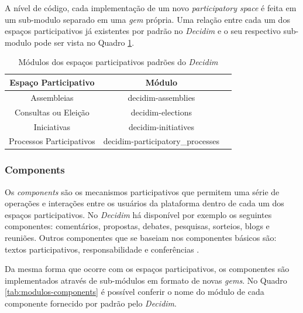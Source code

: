 A nível de código, cada implementação de um novo \textit{participatory space} é feita em um sub-modulo separado em uma \textit{gem} própria. Uma relação entre cada um dos espaços participativos já existentes por padrão no \textit{Decidim} e o seu respectivo sub-modulo pode ser vista no Quadro \ref{tab:modulos-participatoryspaces}.

\begin{table}
  \centering
  \caption{Módulos dos espaços participativos padrões do \textit{Decidim}}
  \label{tab:modulos-participatoryspaces}
  \begin{tabular}{|c|c|c|}
    \hline
    Espaço Participativo & Módulo \\
    \hline
    Assembleias & decidim-assemblies \\
    Consultas ou Eleição & decidim-elections \\
    Iniciativas & decidim-initiatives \\
    Processos Participativos & decidim-participatory\_processes \\
    \hline
  \end{tabular}
\end{table}

\subsubsection{Components}

Os \textit{components} são os mecanismos participativos que permitem uma série de operações e interações entre os usuários da plataforma dentro de cada um dos espaços participativos. No \textit{Decidim} há disponível por exemplo os seguintes componentes: comentários, propostas, debates, pesquisas, sorteios, blogs e reuniões. Outros componentes que se baseiam nos componentes básicos são: textos participativos, responsabilidade e conferências \cite{decidim-descriptionpage}.

Da mesma forma que ocorre com os espaços participativos, os componentes são implementados através de sub-módulos em formato de novas \textit{gems}. No Quadro \ref{tab:modulos-components} é possível conferir o nome do módulo de cada componente fornecido por padrão pelo \textit{Decidim}.

